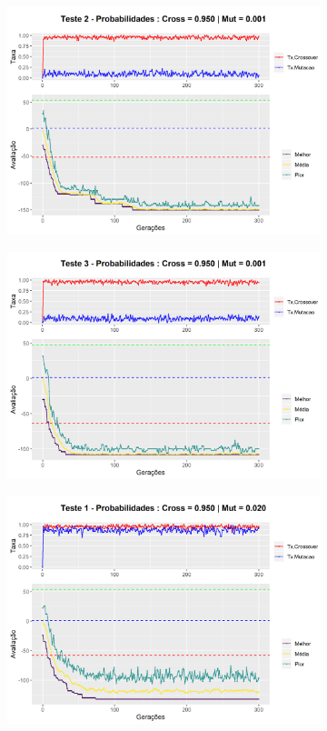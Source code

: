 \begin{figure}[ht]
\begin{subfigure}[b]{0.47\linewidth}
		\includegraphics[width=\linewidth]{imagens/graph_pc_0_950_pm_0_001_pop_50_g_300__2.png}
		\caption{}
	\end{subfigure}
	\begin{subfigure}[b]{0.47\linewidth}
		\includegraphics[width=\linewidth]{imagens/graph_pc_0_950_pm_0_001_pop_50_g_300__3.png}
		\caption{}
	\end{subfigure}
	\begin{subfigure}[b]{0.47\linewidth}
		\includegraphics[width=\linewidth]{imagens/graph_pc_0_950_pm_0_020_pop_50_g_300__1.png}

\end{subfigure}
\end{figure}

